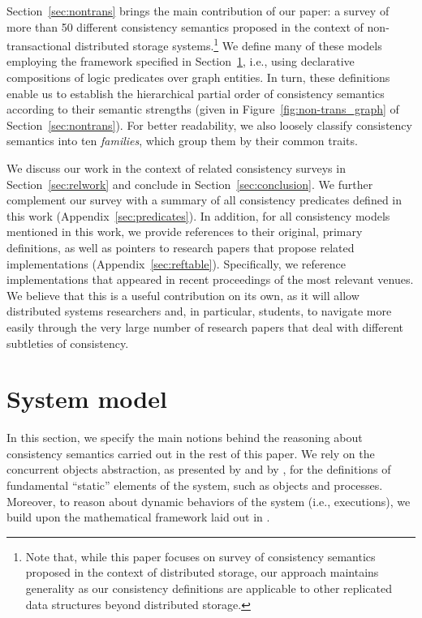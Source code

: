 \documentclass[letter, 11pt]{article}
\newcommand{\citeN}{\citet}
\renewcommand{\cite}{\citep}
\begin{document}
Section~\ref{sec:nontrans} brings the main contribution of our paper: a survey of more than 50 different consistency semantics proposed in the context of non-transactional distributed storage systems.\footnote{Note that, while this paper focuses on survey of consistency semantics proposed in the context of distributed storage, our approach maintains generality as our consistency definitions are applicable to other replicated data structures beyond distributed storage.} We define many of these models employing the framework specified in Section~\ref{sec:model}, i.e., using declarative compositions of logic predicates over graph entities.
In turn, these definitions 
enable us to establish the hierarchical partial order of consistency semantics according to their semantic strengths (given in Figure~\ref{fig:non-trans_graph} of Section~\ref{sec:nontrans}). For better readability, we also loosely classify consistency semantics into ten \emph{families}, which group them by their common traits.

We  discuss our work in the context of related consistency surveys in Section~\ref{sec:relwork} and conclude in Section~\ref{sec:conclusion}.  We further complement our survey with a summary of all consistency predicates defined in this work (Appendix~\ref{sec:predicates}). In addition, for all consistency models mentioned in this work,
we provide references to their original, primary definitions, as well as pointers to research papers that propose related implementations (Appendix~\ref{sec:reftable}).
Specifically, we reference implementations that appeared in recent proceedings of the most relevant venues. We believe that this is a useful contribution on its own, as it will allow distributed systems researchers and, in particular, students, to navigate more easily through the very large number of research papers that deal with different subtleties of consistency. 



 
\section{System model}
\label{sec:model}


In this section, we specify the main notions behind the reasoning about consistency semantics 
carried out in the rest of this paper. 
We rely on the concurrent objects abstraction, as presented by \citeN{Lynch.Tuttle:89} and by \citeN{Herlihy.Wing:90}, 
for the definitions of fundamental ``static'' elements of the system, such as objects and processes. Moreover, to reason about dynamic behaviors of the system (i.e., executions), we build upon the mathematical 
framework laid out in \cite{Burckhardt:14}.
\end{document}
